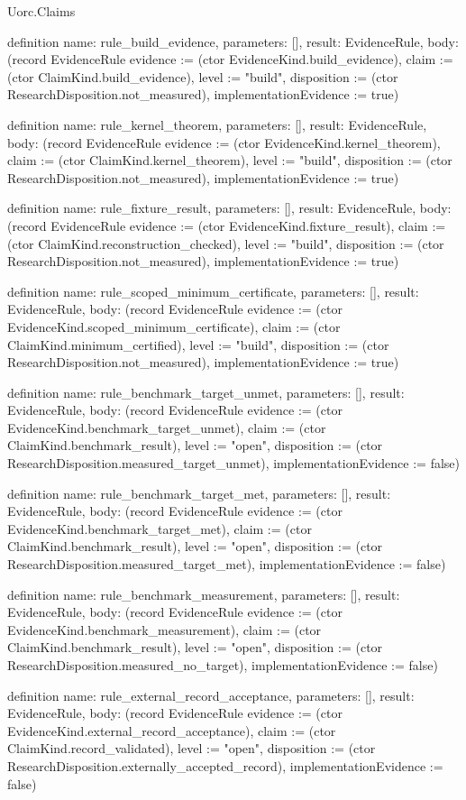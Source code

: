 \begin{lexlean}{Uorc.Claims}
\begin{semanticmodule}
definition{
  name: rule_build_evidence,
  parameters: [],
  result: EvidenceRule,
  body: (record EvidenceRule {evidence := (ctor EvidenceKind.build_evidence), claim := (ctor ClaimKind.build_evidence), level := "build", disposition := (ctor ResearchDisposition.not_measured), implementationEvidence := true})
}

definition{
  name: rule_kernel_theorem,
  parameters: [],
  result: EvidenceRule,
  body: (record EvidenceRule {evidence := (ctor EvidenceKind.kernel_theorem), claim := (ctor ClaimKind.kernel_theorem), level := "build", disposition := (ctor ResearchDisposition.not_measured), implementationEvidence := true})
}

definition{
  name: rule_fixture_result,
  parameters: [],
  result: EvidenceRule,
  body: (record EvidenceRule {evidence := (ctor EvidenceKind.fixture_result), claim := (ctor ClaimKind.reconstruction_checked), level := "build", disposition := (ctor ResearchDisposition.not_measured), implementationEvidence := true})
}

definition{
  name: rule_scoped_minimum_certificate,
  parameters: [],
  result: EvidenceRule,
  body: (record EvidenceRule {evidence := (ctor EvidenceKind.scoped_minimum_certificate), claim := (ctor ClaimKind.minimum_certified), level := "build", disposition := (ctor ResearchDisposition.not_measured), implementationEvidence := true})
}

definition{
  name: rule_benchmark_target_unmet,
  parameters: [],
  result: EvidenceRule,
  body: (record EvidenceRule {evidence := (ctor EvidenceKind.benchmark_target_unmet), claim := (ctor ClaimKind.benchmark_result), level := "open", disposition := (ctor ResearchDisposition.measured_target_unmet), implementationEvidence := false})
}

definition{
  name: rule_benchmark_target_met,
  parameters: [],
  result: EvidenceRule,
  body: (record EvidenceRule {evidence := (ctor EvidenceKind.benchmark_target_met), claim := (ctor ClaimKind.benchmark_result), level := "open", disposition := (ctor ResearchDisposition.measured_target_met), implementationEvidence := false})
}

definition{
  name: rule_benchmark_measurement,
  parameters: [],
  result: EvidenceRule,
  body: (record EvidenceRule {evidence := (ctor EvidenceKind.benchmark_measurement), claim := (ctor ClaimKind.benchmark_result), level := "open", disposition := (ctor ResearchDisposition.measured_no_target), implementationEvidence := false})
}

definition{
  name: rule_external_record_acceptance,
  parameters: [],
  result: EvidenceRule,
  body: (record EvidenceRule {evidence := (ctor EvidenceKind.external_record_acceptance), claim := (ctor ClaimKind.record_validated), level := "open", disposition := (ctor ResearchDisposition.externally_accepted_record), implementationEvidence := false})
}


\end{semanticmodule}
\end{lexlean}
